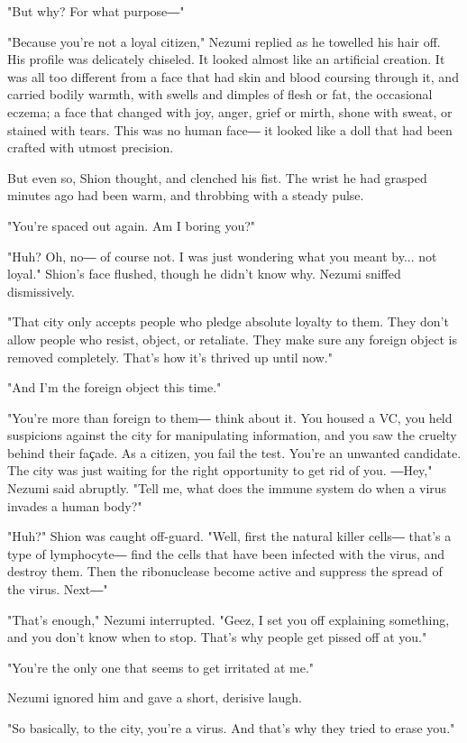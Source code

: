 "But why? For what purpose―"

"Because you're not a loyal citizen," Nezumi replied as he towelled his
hair off. His profile was delicately chiseled. It looked almost like an
artificial creation. It was all too different from a face that had skin
and blood coursing through it, and carried bodily warmth, with swells
and dimples of flesh or fat, the occasional eczema; a face that changed
with joy, anger, grief or mirth, shone with sweat, or stained with
tears. This was no human face― it looked like a doll that had been
crafted with utmost precision.

But even so, Shion thought, and clenched his fist. The wrist he had
grasped minutes ago had been warm, and throbbing with a steady pulse.

"You're spaced out again. Am I boring you?"

"Huh? Oh, no― of course not. I was just wondering what you meant by...
not loyal." Shion's face flushed, though he didn't know why. Nezumi
sniffed dismissively.

"That city only accepts people who pledge absolute loyalty to them. They
don't allow people who resist, object, or retaliate. They make sure any
foreign object is removed completely. That's how it's thrived up until
now."

"And I'm the foreign object this time."

"You're more than foreign to them― think about it. You housed a VC, you
held suspicions against the city for manipulating information, and you
saw the cruelty behind their faҫade. As a citizen, you fail the test.
You're an unwanted candidate. The city was just waiting for the right
opportunity to get rid of you. ―Hey," Nezumi said abruptly. "Tell me,
what does the immune system do when a virus invades a human body?"

"Huh?" Shion was caught off-guard. "Well, first the natural killer
cells― that's a type of lymphocyte― find the cells that have been
infected with the virus, and destroy them. Then the ribonuclease become
active and suppress the spread of the virus. Next―"

"That's enough," Nezumi interrupted. "Geez, I set you off explaining
something, and you don't know when to stop. That's why people get pissed
off at you."

"You're the only one that seems to get irritated at me."

Nezumi ignored him and gave a short, derisive laugh.

"So basically, to the city, you're a virus. And that's why they tried to
erase you."

